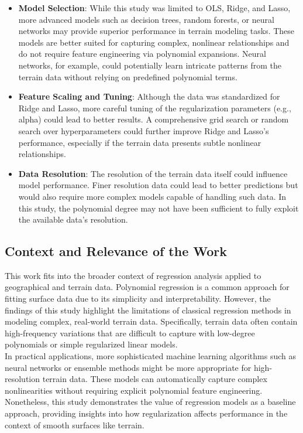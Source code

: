 \documentclass{article}
\begin{document}
\begin{enumerate}
\begin{itemize}
    \item \textbf{Model Selection}: While this study was limited to OLS, Ridge, and Lasso, more advanced models such as decision trees, random forests, or neural networks may provide superior performance in terrain modeling tasks. These models are better suited for capturing complex, nonlinear relationships and do not require feature engineering via polynomial expansions. Neural networks, for example, could potentially learn intricate patterns from the terrain data without relying on predefined polynomial terms.
    
    \item \textbf{Feature Scaling and Tuning}: Although the data was standardized for Ridge and Lasso, more careful tuning of the regularization parameters (e.g., alpha) could lead to better results. A comprehensive grid search or random search over hyperparameters could further improve Ridge and Lasso's performance, especially if the terrain data presents subtle nonlinear relationships.
    
    \item \textbf{Data Resolution}: The resolution of the terrain data itself could influence model performance. Finer resolution data could lead to better predictions but would also require more complex models capable of handling such data. In this study, the polynomial degree may not have been sufficient to fully exploit the available data's resolution.
\end{itemize}

\subsection{Context and Relevance of the Work}

This work fits into the broader context of regression analysis applied to geographical and terrain data. Polynomial regression is a common approach for fitting surface data due to its simplicity and interpretability. However, the findings of this study highlight the limitations of classical regression methods in modeling complex, real-world terrain data. Specifically, terrain data often contain high-frequency variations that are difficult to capture with low-degree polynomials or simple regularized linear models.\\

In practical applications, more sophisticated machine learning algorithms such as neural networks or ensemble methods might be more appropriate for high-resolution terrain data. These models can automatically capture complex nonlinearities without requiring explicit polynomial feature engineering. Nonetheless, this study demonstrates the value of regression models as a baseline approach, providing insights into how regularization affects performance in the context of smooth surfaces like terrain.\\


\end{enumerate}
\end{document}
